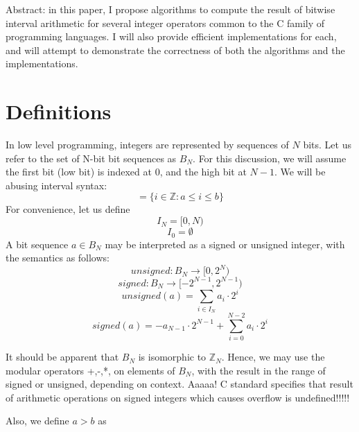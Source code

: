 \documentclass{article}
\begin{document}
Abstract: in this paper, I propose algorithms to compute the result of 
bitwise interval arithmetic for several integer operators common to the 
C family of programming languages.  I will also provide efficient 
implementations for each, and will attempt to demonstrate the correctness 
of both the algorithms and the implementations.

\section{Definitions}

In low level programming, integers are represented by sequences of $N$ 
bits. Let us refer to the set of N-bit bit sequences as $B_N$. 
For this discussion, we will assume the first bit (low bit) 
is indexed at $0$, and 
the high bit at $N-1$. We will be abusing interval syntax:
\begin{equation*} 
[a,b] = \{i \in \mathbb{Z} : a \le i \le b\}
\end{equation*}
For convenience, let us define
\begin{equation*}
I_N = [0, N)
\end{equation*}
\begin{equation*}
I_0 = \emptyset
\end{equation*}
A bit sequence $a \in B_N$ may be interpreted as a signed or unsigned 
integer, with the semantics as follows:
\begin{equation}\label{unsf} 
unsigned : B_N \rightarrow [0,2^N)
\end{equation}
\begin{equation}\label{sgnf} 
signed : B_N \rightarrow [-2^{N-1},2^{N-1})
\end{equation}
\begin{equation}\label{unsdef} 
unsigned(a) = \sum_{i\in I_N} {a_i} \cdot 2^i
\end{equation}
\begin{equation}\label{sgndef} 
signed(a) = - a_{N-1} \cdot 2^{N-1} + \sum_{i = 0}^{N-2} {a_i} \cdot 2^i
\end{equation}

It should be apparent that $B_N$ is isomorphic to $\mathbb{Z}_N$. 
Hence, we may use the modular operators +,-,*, on elements of $B_N$, with 
the result in the range of signed or unsigned, depending on context.
Aaaaa! C standard specifies that result of arithmetic operations on 
signed integers
which causes overflow is undefined!!!!!

Also, we define $a>b$ as 
\end{document}
